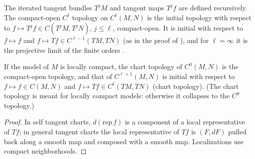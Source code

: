 \begin{definition}
  \label{def:gn-topology}
  \leanok
  The iterated tangent bundles $T^j M$ and tangent maps $T^j f$ are defined recursively. The
  compact-open $C^\ell$ topology on $C^\ell(M, N)$ is the initial topology with respect to
  $f \mapsto T^j f \in C(T^j M, T^j N)$, $j \le \ell$, compact-open. It is initial with respect to
  $f \mapsto f$ and $f \mapsto Tf \in C^{\ell-1}(TM, TN)$ (as in the proof of
  \cite[Lemma~4.1.6]{GN26}), and for $\ell = \infty$ it is the projective limit of the finite
  orders \cite[Remark~4.1.3(b)]{GN26}.
\end{definition}

\begin{proposition}
  \label{prop:chart-topology-succ}
  \leanok
  If the model of $M$ is locally compact, the chart topology of $C^0(M, N)$ is the compact-open
  topology, and that of $C^{\ell+1}(M, N)$ is initial with respect to $f \mapsto f \in C(M, N)$
  and $f \mapsto Tf \in C^\ell(TM, TN)$ (chart topology). (The chart topology is meant for locally
  compact models: otherwise it collapses to the $C^0$ topology.)
\end{proposition}

\begin{proof}
  \leanok
  In self tangent charts, $d(\mathrm{rep}\,f)$ is a component of a local representative of $Tf$;
  in general tangent charts the local representative of $Tf$ is $(F, dF)$ pulled back along a
  smooth map and composed with a smooth map. Localizations use compact neighborhoods.
\end{proof}

